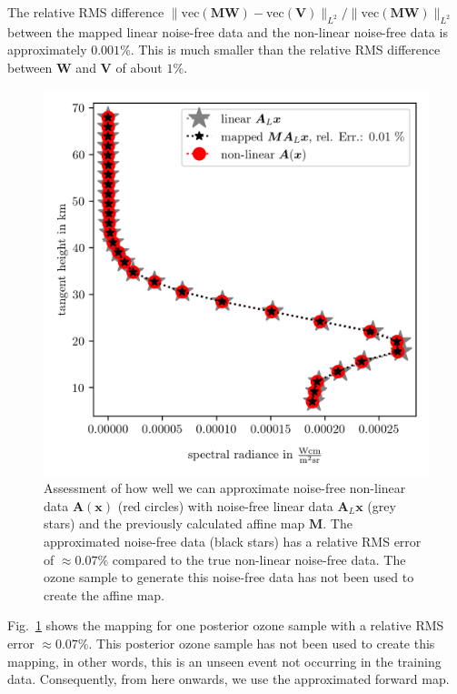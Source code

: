 The relative RMS difference $\lVert \text{vec}(\bm{M}\bm{W}) - \text{vec}(\bm{V})  \rVert_{L^2} / \lVert \text{vec}(\bm{M}\bm{W}) \rVert_{L^2} $ between the mapped linear noise-free data and the non-linear noise-free data is approximately $0.001\%$.
This is much smaller than the relative RMS difference between $\bm{W}$ and $\bm{V}$ of about $1\%$.
\begin{figure}[t!]
	\centering
	\includegraphics{SampMapAssesmentTT.png}
	\caption[Assessment of affine map.]{Assessment of how well we can approximate noise-free non-linear data $\bm{A}(\bm{x})$  (red circles) with noise-free linear data $\bm{A}_L\bm{x}$ (grey stars) and the previously calculated affine map $\bm{M}$. The approximated noise-free data (black stars) has a relative RMS error of $\approx 0.07\%$ compared to the true non-linear noise-free data.
		The ozone sample to generate this noise-free data has not been used to create the affine map.}
	\label{fig:MapAsses}
\end{figure}
Fig.~\ref{fig:MapAsses} shows the mapping for one posterior ozone sample with a relative RMS error $\approx0.07\%$.
This posterior ozone sample has not been used to create this mapping, in other words, this is an unseen event not occurring in the training data.
Consequently, from here onwards, we use the approximated forward map.
